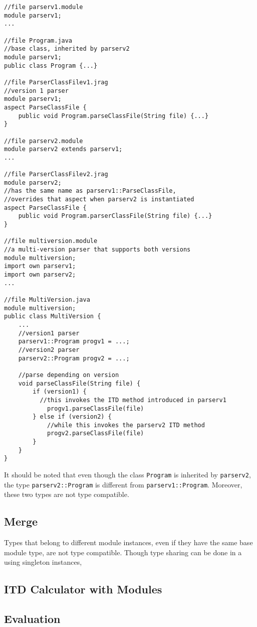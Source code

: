 \begin{lstlisting}
//file parserv1.module
module parserv1;
...

//file Program.java
//base class, inherited by parserv2
module parserv1;
public class Program {...}

//file ParserClassFilev1.jrag
//version 1 parser
module parserv1;
aspect ParseClassFile {
	public void Program.parseClassFile(String file) {...}
}

//file parserv2.module
module parserv2 extends parserv1;
...

//file ParserClassFilev2.jrag
module parserv2;
//has the same name as parserv1::ParseClassFile, 
//overrides that aspect when parserv2 is instantiated
aspect ParseClassFile {
	public void Program.parserClassFile(String file) {...}
}

//file multiversion.module
//a multi-version parser that supports both versions
module multiversion;
import own parserv1;
import own parserv2;
...

//file MultiVersion.java
module multiversion;
public class MultiVersion {
	...
	//version1 parser
	parserv1::Program progv1 = ...;
	//version2 parser
	parserv2::Program progv2 = ...;
	
	//parse depending on version
	void parseClassFile(String file) {
		if (version1) {
		  //this invokes the ITD method introduced in parserv1
			progv1.parseClassFile(file)
		} else if (version2) {
			//while this invokes the parserv2 ITD method
			progv2.parseClassFile(file)
		}
	}
}
\end{lstlisting}

It should be noted that even though the class \texttt{Program}
is inherited by \texttt{parserv2}, the type
\texttt{parserv2::Program} is different from \texttt{parserv1::Program}. Moreover,
these two types are not type compatible.

\subsection{Merge}

Types that belong to different module instances, even if they have the same
base module type, are not type compatible. Though type sharing can be done
in a using singleton instances, 




\subsection{ITD Calculator with Modules}

\subsection{Evaluation}

